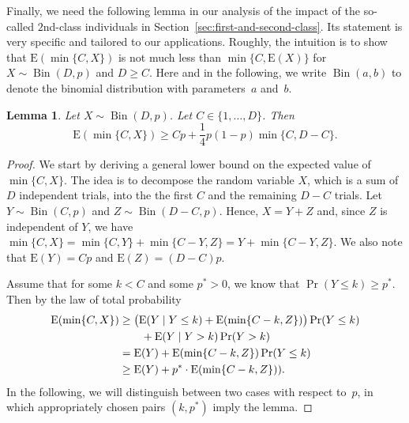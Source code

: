 \documentclass[11pt, a4paper]{article}
\newtheorem{lemma}{Lemma}
\DeclareMathOperator{\Prob}{Pr}
\newcommand*{\E}{\mathrm{E}}
\DeclareMathOperator{\Bin}{Bin}
\begin{document}
Finally, we need the following lemma in our analysis of the impact of the so-called $2$nd-class individuals in Section~\ref{sec:first-and-second-class}. Its statement is 
very specific and tailored to our applications. Roughly, the intuition is to show that $\E(\min\{C,X\})$ is not much less than 
$\min\{C,\E(X)\}$ for $X\sim \Bin(D,p)$ and $D\ge C$. Here and in the following, we write $\Bin(a,b)$ to denote the binomial distribution with 
parameters~$a$ and~$b$.


\begin{lemma}
\label{lem:concave-expec}
Let $X\sim \Bin(D,p)$. Let $C\in\{1,\dots,D\}$. 
Then 
\[\E(\min\{C,X\})\ge Cp + \frac{1}{4} p (1-p) \min\{C,D-C\}.\]
\end{lemma}

\begin{proof}
We start by deriving a general lower bound on the expected value of $\min\{C,X\}$. The idea is to 
decompose the random variable $X$, which is a sum of $D$ independent trials, 
into the the first $C$ and the remaining $D-C$ trials. 
Let $Y\sim\Bin(C,p)$  and 
$Z\sim\Bin(D-C,p)$. Hence, $X=Y+Z$ and, since $Z$ is independent of $Y$, we have 
$\min\{C,X\} = \min\{C,Y\} + \min\{C-Y, Z\} =  
Y + \min\{C-Y,Z\}$. We also note that $\E(Y)=Cp$ and $\E(Z)=(D-C)p$. 

Assume that  for some $k<C$ and some $p^*>0$, we know that $\Prob(Y\le k)\ge p^*$. Then  
 by the law of total probability 
\begin{align}
\E(\min\{C,X\}) & \ge \bigl(\E(Y\mid Y\le k) + \E(\min\{C-k, Z\}) \bigr) \Prob(Y\le k) \notag \\ & \qquad + 
\E(Y\mid Y > k) \Prob(Y > k) \notag \\
&  = \E(Y) + \E(\min\{C-k, Z\})  \Prob(Y\le k) \notag \\
& \ge  \E(Y) + p^*\cdot \E(\min\{C-k, Z\}) ).
\label{eq:lemconcaveexp-1}
\end{align}
In the following, we will distinguish between two cases with respect to~$p$, 
in which appropriately chosen  pairs $(k,p^*)$ 
 imply the lemma. 


\end{proof}
\end{document}
